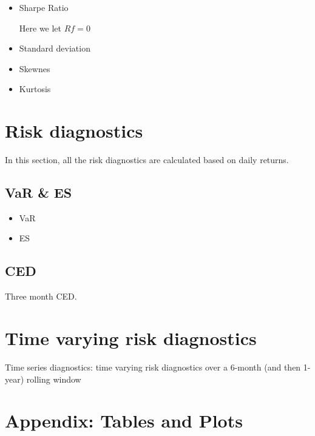 \documentclass[12pt]{article}
\begin{document}
\begin{itemize}
\item Sharpe Ratio

Here we let $Rf = 0$
\item Standard deviation
\item Skewnes
\item Kurtosis
\end{itemize}




\section{Risk diagnostics}

In this section, all the risk diagnostics are calculated based on daily returns.

\subsection{VaR \& ES}

\begin{itemize}
\item VaR
\item ES
\end{itemize}



\subsection{CED}

Three month CED.



\section{Time varying risk diagnostics}


Time series diagnostics: time varying risk diagnostics over a 6-month (and then 1-year) rolling window


\section{Appendix: Tables and Plots}
\end{document}
